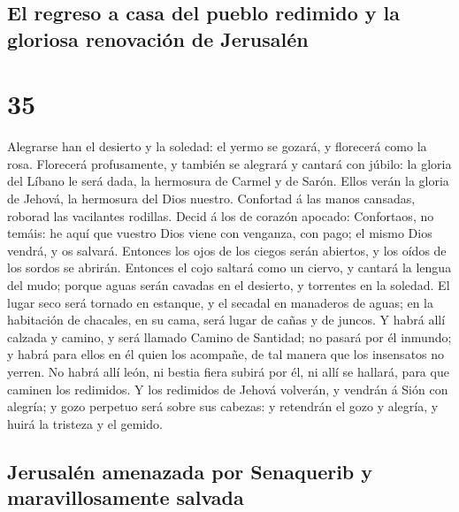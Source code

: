 \hypertarget{el-regreso-a-casa-del-pueblo-redimido-y-la-gloriosa-renovaciuxf3n-de-jerusaluxe9n}{%
\subsection{El regreso a casa del pueblo redimido y la gloriosa
renovación de
Jerusalén}\label{el-regreso-a-casa-del-pueblo-redimido-y-la-gloriosa-renovaciuxf3n-de-jerusaluxe9n}}

\hypertarget{section-34}{%
\section{35}\label{section-34}}

 Alegrarse han el desierto y la soledad: el yermo se
gozará, y florecerá como la rosa.  Florecerá profusamente,
y también se alegrará y cantará con júbilo: la gloria del Líbano le será
dada, la hermosura de Carmel y de Sarón. Ellos verán la gloria de
Jehová, la hermosura del Dios nuestro.  Confortad á las
manos cansadas, roborad las vacilantes rodillas.  Decid á
los de corazón apocado: Confortaos, no temáis: he aquí que vuestro Dios
viene con venganza, con pago; el mismo Dios vendrá, y os salvará.
 Entonces los ojos de los ciegos serán abiertos, y los
oídos de los sordos se abrirán.  Entonces el cojo saltará
como un ciervo, y cantará la lengua del mudo; porque aguas serán cavadas
en el desierto, y torrentes en la soledad.  El lugar seco
será tornado en estanque, y el secadal en manaderos de aguas; en la
habitación de chacales, en su cama, será lugar de cañas y de juncos.
 Y habrá allí calzada y camino, y será llamado Camino de
Santidad; no pasará por él inmundo; y habrá para ellos en él quien los
acompañe, de tal manera que los insensatos no yerren.  No
habrá allí león, ni bestia fiera subirá por él, ni allí se hallará, para
que caminen los redimidos.  Y los redimidos de Jehová
volverán, y vendrán á Sión con alegría; y gozo perpetuo será sobre sus
cabezas: y retendrán el gozo y alegría, y huirá la tristeza y el gemido.

\hypertarget{jerusaluxe9n-amenazada-por-senaquerib-y-maravillosamente-salvada}{%
\subsection{Jerusalén amenazada por Senaquerib y maravillosamente
salvada}\label{jerusaluxe9n-amenazada-por-senaquerib-y-maravillosamente-salvada}}

